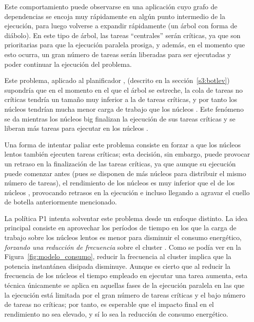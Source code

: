Este comportamiento puede observarse en una aplicación cuyo grafo de
dependencias se encoja muy rápidamente en algún punto intermedio de la
ejecución, para luego volverse a expandir rápidamente (un árbol con forma
de diábolo). En este tipo de árbol, las tareas ``centrales'' serán
críticas, ya que son prioritarias para que la ejecución paralela prosiga, y
además, en el momento que esto ocurra, un gran número de tareas serán
liberadas para ser ejecutadas y poder continuar la ejecución del problema.

Este problema, aplicado al planificador \botlev, (descrito en la
sección~\ref{s3:botlev}) supondría que en el momento en el que el árbol se
estreche, la cola de tareas no críticas tendría un tamaño muy inferior a la
de tareas críticas, y por tanto los núcleos \LITTLE tendrían mucha menor carga
de trabajo que los núcleos \BIG. Este fenómeno se da mientras los núcleos big
finalizan la ejecución de sus tareas críticas y se liberan más tareas para
ejecutar en los núcleos \LITTLE.

Una forma de intentar paliar este problema consiste en forzar a que los
núcleos lentos también ejecuten tareas críticas; esta decisión, sin
embargo, puede provocar un retraso en la finalización de las tareas
críticas, ya que aunque su ejecución puede comenzar antes (pues se disponen
de más núcleos para distribuir el mismo número de tareas), el rendimiento
de los núcleos \LITTLE es muy inferior que el de los núcleos \BIG, provocando
retrasos en la ejecución e incluso llegando a agravar el cuello de botella
anteriormente mencionado.

La política P1 intenta solventar este problema desde un enfoque
distinto. La idea principal consiste en aprovechar los períodos de tiempo
en los que la carga de trabajo sobre los núcleos lentos es menor para
disminuir el consumo energético, {\em forzando una reducción de frecuencia}
sobre el cluster \LITTLE.  Como se podía ver en la
Figura~\ref{fig:modelo_consumo}, reducir la frecuencia al cluster \LITTLE
implica que la potencia instantánea disipada disminuye. Aunque es cierto
que al reducir la frecuencia de los núcleos el tiempo empleado en ejecutar
una tarea aumenta, esta técnica únicamente se aplica en aquellas fases de
la ejecución paralela en las que la ejecución está limitada por el gran
número de tareas críticas y el bajo número de tareas no críticas; por
tanto, es esperable que el impacto final en el rendimiento no sea elevado,
y sí lo sea la reducción de consumo energético.

